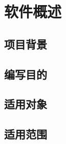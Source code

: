 %
%
\section{软件概述}
\subsection{项目背景}



\subsection{编写目的}




\subsection{适用对象}





\subsection{适用范围}



